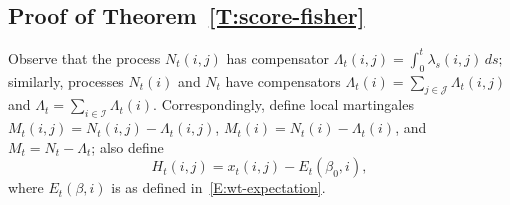 \documentclass[final]{statsoc}
\begin{document}
\subsection{Proof of Theorem~\ref{T:score-fisher}}

Observe that the process $N_t(i,j)$ has compensator
\(
    \Lambda_t(i,j)
        =
            \int_0^t \lambda_s(i,j) \, ds;
\)
similarly, processes $N_t(i)$ and $N_t$ have compensators
$\Lambda_t(i) = \sum_{j \in \mathcal{J}} \Lambda_t(i,j)$
and $\Lambda_t = \sum_{i \in \mathcal{I}} \Lambda_t(i)$.  Correspondingly,
define local martingales $M_t(i,j) = N_t(i,j) - \Lambda_t(i,j)$,
$M_t(i) = N_t(i) - \Lambda_t(i)$, and $M_t = N_t - \Lambda_t$;
also define
\[
    H_t(i,j)
        =
        x_t(i,j) - E_t(\beta_0,i),
\]
where $E_t(\beta,i)$ is as defined in~\eqref{E:wt-expectation}.
\end{document}
